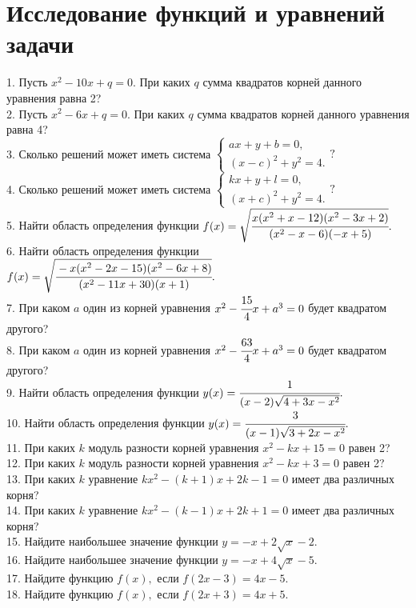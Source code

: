 \documentclass[12pt]{article}
\begin{document}
\section{Исследование функций и уравнений задачи}
1. Пусть $x^2-10x+q=0.$ При каких $q$ сумма квадратов корней данного уравнения равна 2?\\
2. Пусть $x^2-6x+q=0.$ При каких $q$ сумма квадратов корней данного уравнения равна 4?\\
3. Сколько решений может иметь система $\begin{cases} ax+y+b=0,\\ (x-c)^2+y^2=4.\end{cases}?$\\
4. Сколько решений может иметь система $\begin{cases} kx+y+l=0,\\ (x+c)^2+y^2=4.\end{cases}?$\\
5. Найти область определения функции $f(x)=\sqrt{\cfrac{x(x^2+x-12)(x^2-3x+2)}{(x^2-x-6)(-x+5)}}.$\\
6. Найти область определения функции $f(x)=\sqrt{\cfrac{-x(x^2-2x-15)(x^2-6x+8)}{(x^2-11x+30)(x+1)}}.$\\
7. При каком $a$ один из корней уравнения $x^2-\cfrac{15}{4}x+a^3=0$ будет квадратом другого?\\
8. При каком $a$ один из корней уравнения $x^2-\cfrac{63}{4}x+a^3=0$ будет квадратом другого?\\
9. Найти область определения функции $y(x)=\cfrac{1}{(x-2)\sqrt{4+3x-x^2}}.$\\
10. Найти область определения функции $y(x)=\cfrac{3}{(x-1)\sqrt{3+2x-x^2}}.$\\
11. При каких $k$ модуль разности корней уравнения $x^2-kx+15=0$ равен 2?\\
12. При каких $k$ модуль разности корней уравнения $x^2-kx+3=0$ равен 2?\\
13. При каких $k$ уравнение $kx^2-(k+1)x+2k-1=0$ имеет два различных корня?\\
14. При каких $k$ уравнение $kx^2-(k-1)x+2k+1=0$ имеет два различных корня?\\
15. Найдите наибольшее значение функции $y=-x+2\sqrt{x}-2.$\\
16. Найдите наибольшее значение функции $y=-x+4\sqrt{x}-5.$\\
17. Найдите функцию $f(x),$ если $f(2x-3)=4x-5.$\\
18. Найдите функцию $f(x),$ если $f(2x+3)=4x+5.$\\
\end{document}

